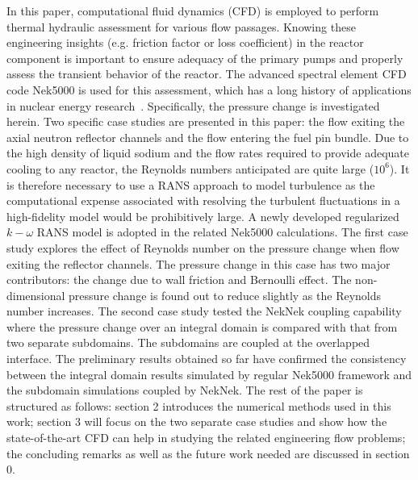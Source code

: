 \documentclass[11pt,letterpaper,english]{article}
\begin{document}
In this paper, computational fluid dynamics (CFD) is employed to perform thermal hydraulic assessment for various flow passages. Knowing these engineering insights (e.g. friction factor or loss coefficient) in the reactor component is important to ensure adequacy of the primary pumps and properly assess the transient behavior of the reactor. The advanced spectral element CFD code Nek5000 is used for this assessment, which has a long history of applications in nuclear energy research~\citep{Merzari2012,Fick2017,Shaver2019,Yildiz2019,Merzari2019}. Specifically, the pressure change is investigated herein. Two specific case studies are presented in this paper: the flow exiting the axial neutron reflector channels and the flow entering the fuel pin bundle. Due to the high density of liquid sodium and the flow rates required to provide adequate cooling to any reactor, the Reynolds numbers anticipated are quite large ($10^6$). It is therefore necessary to use a RANS approach to model turbulence as the computational expense associated with resolving the turbulent fluctuations in a high-fidelity model would be prohibitively large. A newly developed regularized $k-\omega$ RANS model is adopted in the related Nek5000 calculations. The first case study explores the effect of Reynolds number on the pressure change when flow exiting the reflector channels. The pressure change in this case has two major contributors: the change due to wall friction and Bernoulli effect. The non-dimensional pressure change is found out to reduce slightly as the Reynolds number increases. The second case study tested the NekNek coupling capability where the pressure change over an integral domain is compared with that from two separate subdomains. The subdomains are coupled at the overlapped interface. The preliminary results obtained so far have confirmed the consistency between the integral domain results simulated by regular Nek5000 framework and the subdomain simulations coupled by NekNek. The rest of the paper is structured as follows: section 2 introduces the numerical methods used in this work; section 3 will focus on the two separate case studies and show how the state-of-the-art CFD can help in studying the related engineering flow problems; the concluding remarks as well as the future work needed are discussed in section 0. 






\end{document}
